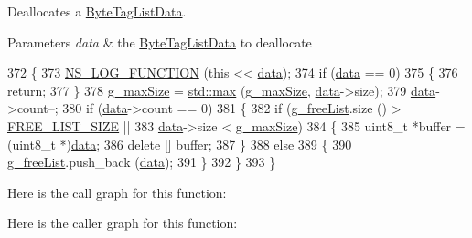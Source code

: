 Deallocates a \hyperlink{structns3_1_1ByteTagListData}{Byte\+Tag\+List\+Data}. 


\begin{DoxyParams}{Parameters}
{\em data} & the \hyperlink{structns3_1_1ByteTagListData}{Byte\+Tag\+List\+Data} to deallocate \\
\hline
\end{DoxyParams}

\begin{DoxyCode}
372 \{
373   \hyperlink{log-macros-disabled_8h_a90b90d5bad1f39cb1b64923ea94c0761}{NS\_LOG\_FUNCTION} (\textcolor{keyword}{this} << \hyperlink{topology-example-sim_8cc_a26c65296e316af77b787dc77469bb2a4}{data});
374   \textcolor{keywordflow}{if} (\hyperlink{topology-example-sim_8cc_a26c65296e316af77b787dc77469bb2a4}{data} == 0)
375     \{
376       \textcolor{keywordflow}{return};
377     \}
378   \hyperlink{namespacens3_ad6ad8119b41070b28e1d8ec60839f48c}{g\_maxSize} = \hyperlink{80211b_8c_affe776513b24d84b39af8ab0930fef7f}{std::max} (\hyperlink{namespacens3_ad6ad8119b41070b28e1d8ec60839f48c}{g\_maxSize}, \hyperlink{topology-example-sim_8cc_a26c65296e316af77b787dc77469bb2a4}{data}->size);
379   \hyperlink{topology-example-sim_8cc_a26c65296e316af77b787dc77469bb2a4}{data}->count--;
380   \textcolor{keywordflow}{if} (\hyperlink{topology-example-sim_8cc_a26c65296e316af77b787dc77469bb2a4}{data}->count == 0)
381     \{
382       \textcolor{keywordflow}{if} (\hyperlink{group__packet_gaed1170b07d22fd956e755d86bf5e5f08}{g\_freeList}.size () > \hyperlink{byte-tag-list_8cc_a4a538c177154ed9284055c497ff3689f}{FREE\_LIST\_SIZE} ||
383           \hyperlink{topology-example-sim_8cc_a26c65296e316af77b787dc77469bb2a4}{data}->size < \hyperlink{namespacens3_ad6ad8119b41070b28e1d8ec60839f48c}{g\_maxSize})
384         \{
385           uint8\_t *buffer = (uint8\_t *)\hyperlink{topology-example-sim_8cc_a26c65296e316af77b787dc77469bb2a4}{data};
386           \textcolor{keyword}{delete} [] buffer;
387         \}
388       \textcolor{keywordflow}{else}
389         \{
390           \hyperlink{group__packet_gaed1170b07d22fd956e755d86bf5e5f08}{g\_freeList}.push\_back (\hyperlink{topology-example-sim_8cc_a26c65296e316af77b787dc77469bb2a4}{data});
391         \}
392     \}
393 \}
\end{DoxyCode}


Here is the call graph for this function\+:




Here is the caller graph for this function\+:


